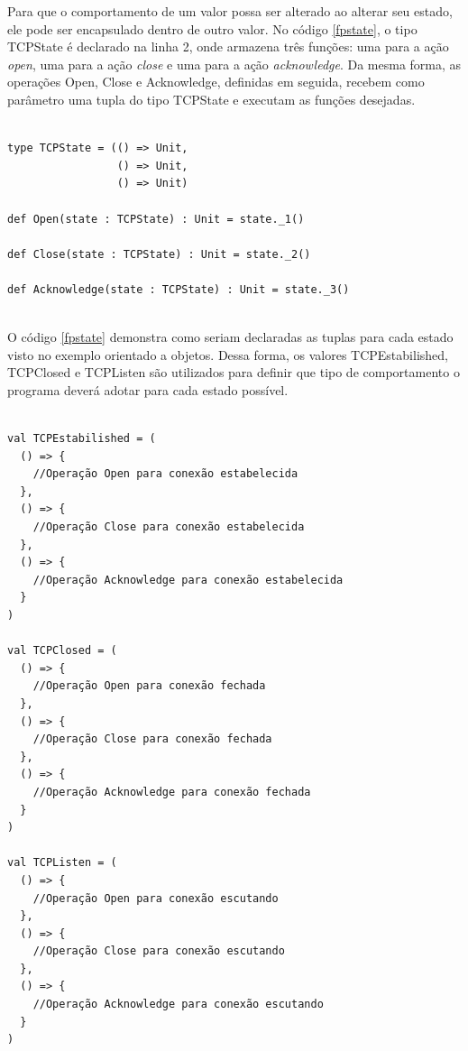 Para que o comportamento de um valor possa 
ser alterado ao alterar seu estado, ele 
pode ser encapsulado dentro de outro valor. 
No código \ref{fpstate}, o tipo TCPState 
é declarado na linha 2, onde armazena 
três funções: uma para a ação \textit{open}, 
uma para a ação \textit{close} e uma para 
a ação \textit{acknowledge}. Da mesma forma, 
as operações Open, Close e Acknowledge, 
definidas em seguida, recebem como 
parâmetro uma tupla do tipo TCPState e 
executam as funções desejadas.

\begin{lstlisting}[caption={State Funcional},label=fpstate]
    
type TCPState = (() => Unit,
                 () => Unit,
                 () => Unit)

def Open(state : TCPState) : Unit = state._1()

def Close(state : TCPState) : Unit = state._2()

def Acknowledge(state : TCPState) : Unit = state._3()
    
\end{lstlisting}

O código \ref{fpstate} demonstra como seriam 
declaradas as tuplas para cada estado visto 
no exemplo orientado a objetos. Dessa forma, 
os valores TCPEstabilished, TCPClosed e 
TCPListen são utilizados para definir que 
tipo de comportamento o programa deverá 
adotar para cada estado possível.

\begin{lstlisting}[caption={State Funcional},label=fpstate]
    
val TCPEstabilished = (
  () => {
    //Operação Open para conexão estabelecida
  },
  () => {
    //Operação Close para conexão estabelecida
  },
  () => {
    //Operação Acknowledge para conexão estabelecida
  }
)

val TCPClosed = (
  () => {
    //Operação Open para conexão fechada
  },
  () => {
    //Operação Close para conexão fechada
  },
  () => {
    //Operação Acknowledge para conexão fechada
  }
)

val TCPListen = (
  () => {
    //Operação Open para conexão escutando
  },
  () => {
    //Operação Close para conexão escutando
  },
  () => {
    //Operação Acknowledge para conexão escutando
  }
)
    
\end{lstlisting}